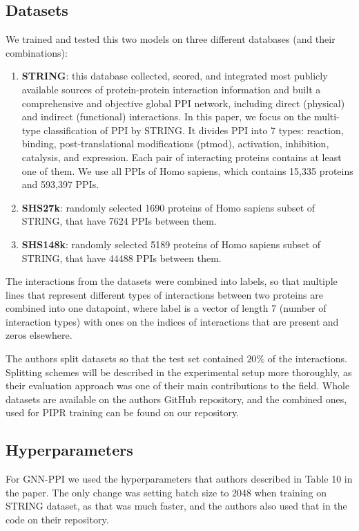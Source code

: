 \subsection{Datasets}
We trained and tested this two models on three different databases (and their combinations):

\begin{enumerate}[(1)]
    \item \textbf{STRING}: this database collected, scored, and integrated most
    publicly available sources of protein-protein interaction information and built a comprehensive and objective global PPI network, including direct (physical) and indirect (functional)
    interactions. In this paper, we focus on the multi-type classification of PPI by STRING. It divides PPI into 7 types: reaction, binding, post-translational modifications (ptmod),
    activation, inhibition, catalysis, and expression. Each pair of
    interacting proteins contains at least one of them. We use all PPIs of Homo sapiens, which contains 15,335 proteins and 593,397 PPIs. 
    \item \textbf{SHS27k}: randomly selected 1690 proteins of Homo sapiens subset of STRING, that have 7624 PPIs between them.
    \item \textbf{SHS148k}: randomly selected 5189 proteins of Homo sapiens subset of STRING, that have 44488 PPIs between them.
    
\end{enumerate}

The interactions from the datasets were combined into labels, so that multiple lines that represent different types of interactions between two proteins are combined into one datapoint, where label is a vector of length 7 (number of interaction types) with ones on the indices of interactions that are present and zeros elsewhere. 

The authors split datasets so that the test set contained $20 \%$ of the interactions. Splitting schemes will be described in the experimental setup more thoroughly, as their evaluation approach was one of their main contributions to the field. Whole datasets are available on the authors GitHub repository, and the combined ones, used for PIPR training can be found on our repository.

%
\subsection{Hyperparameters}
For GNN-PPI we used the hyperparameters that authors described in Table 10 in the paper. The only change was setting batch size to 2048 when training on STRING dataset, as that was much faster, and the authors also used that in the code on their repository.

